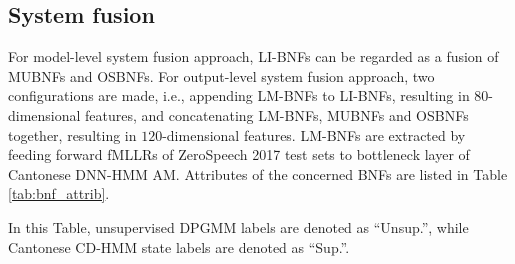 \documentclass[a4paper]{article}
\newcommand{\quotes}[1]{``#1''}
\begin{document}
\subsection{System fusion}
For model-level system fusion approach, LI-BNFs can be regarded as a fusion of MUBNFs and OSBNFs. For output-level system fusion approach, two configurations are made, i.e., appending LM-BNFs to LI-BNFs, resulting in $80$-dimensional features, and concatenating LM-BNFs, MUBNFs and OSBNFs together, resulting in $120$-dimensional features. LM-BNFs are extracted by feeding forward fMLLRs of ZeroSpeech 2017 test sets to bottleneck layer of Cantonese DNN-HMM AM. Attributes of the concerned BNFs  
are listed in Table \ref{tab:bnf_attrib}. 
\begin{table}[htbp]
\renewcommand\arraystretch{0.9}
\centering
\caption{Attributes of LM-BNF, MUBNF, OSBNF and LM-BNF}
\label{tab:bnf_attrib}
\end{table}
In this Table, unsupervised DPGMM labels are denoted as \quotes{Unsup.}, while Cantonese CD-HMM state labels are denoted as \quotes{Sup.}.


\end{document}
